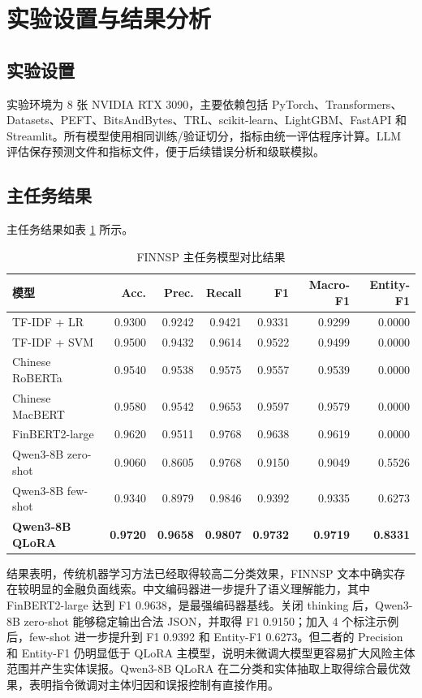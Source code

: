 \documentclass[UTF8,a4paper,12pt]{ctexart}
\begin{document}
\section{实验设置与结果分析}

\subsection{实验设置}

实验环境为 8 张 NVIDIA RTX 3090，主要依赖包括 PyTorch、Transformers、Datasets、PEFT、BitsAndBytes、TRL、scikit-learn、LightGBM、FastAPI 和 Streamlit。所有模型使用相同训练/验证切分，指标由统一评估程序计算。LLM 评估保存预测文件和指标文件，便于后续错误分析和级联模拟。

\subsection{主任务结果}

主任务结果如表 \ref{tab:main_results} 所示。

\begin{table}[H]
\centering
\caption{FINNSP 主任务模型对比结果}
\label{tab:main_results}
\small
\begin{tabular}{lrrrrrr}
\toprule
模型 & Acc. & Prec. & Recall & F1 & Macro-F1 & Entity-F1 \\
\midrule
TF-IDF + LR & 0.9300 & 0.9242 & 0.9421 & 0.9331 & 0.9299 & 0.0000 \\
TF-IDF + SVM & 0.9500 & 0.9432 & 0.9614 & 0.9522 & 0.9499 & 0.0000 \\
Chinese RoBERTa & 0.9540 & 0.9538 & 0.9575 & 0.9557 & 0.9539 & 0.0000 \\
Chinese MacBERT & 0.9580 & 0.9542 & 0.9653 & 0.9597 & 0.9579 & 0.0000 \\
FinBERT2-large & 0.9620 & 0.9511 & 0.9768 & 0.9638 & 0.9619 & 0.0000 \\
Qwen3-8B zero-shot & 0.9060 & 0.8605 & 0.9768 & 0.9150 & 0.9049 & 0.5526 \\
Qwen3-8B few-shot & 0.9340 & 0.8979 & 0.9846 & 0.9392 & 0.9335 & 0.6273 \\
\textbf{Qwen3-8B QLoRA} & \textbf{0.9720} & \textbf{0.9658} & \textbf{0.9807} & \textbf{0.9732} & \textbf{0.9719} & \textbf{0.8331} \\
\bottomrule
\end{tabular}
\end{table}

结果表明，传统机器学习方法已经取得较高二分类效果，FINNSP 文本中确实存在较明显的金融负面线索。中文编码器进一步提升了语义理解能力，其中 FinBERT2-large 达到 F1 0.9638，是最强编码器基线。关闭 thinking 后，Qwen3-8B zero-shot 能够稳定输出合法 JSON，并取得 F1 0.9150；加入 4 个标注示例后，few-shot 进一步提升到 F1 0.9392 和 Entity-F1 0.6273。但二者的 Precision 和 Entity-F1 仍明显低于 QLoRA 主模型，说明未微调大模型更容易扩大风险主体范围并产生实体误报。Qwen3-8B QLoRA 在二分类和实体抽取上取得综合最优效果，表明指令微调对主体归因和误报控制有直接作用。
\end{document}
